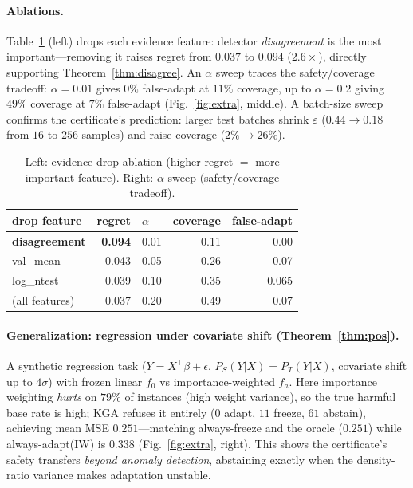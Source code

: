 \documentclass[11pt]{article}
\theoremstyle{plain}
\theoremstyle{definition}
\begin{document}
\paragraph{Ablations.} Table~\ref{tab:abl} (left) drops each evidence feature: detector
\emph{disagreement} is the most important---removing it raises regret from $0.037$ to
$0.094$ ($2.6\times$), directly supporting Theorem~\ref{thm:disagree}. An $\alpha$ sweep
traces the safety/coverage tradeoff: $\alpha{=}0.01$ gives $0\%$ false-adapt at $11\%$
coverage, up to $\alpha{=}0.2$ giving $49\%$ coverage at $7\%$ false-adapt
(Fig.~\ref{fig:extra}, middle). A batch-size sweep confirms the certificate's
prediction: larger test batches shrink $\varepsilon$ ($0.44\!\to\!0.18$ from $16$ to
$256$ samples) and raise coverage ($2\%\!\to\!26\%$).

\begin{table}[h]\centering\small
\begin{tabular}{lr@{\hskip 2em}lrr}
\toprule
drop feature & regret & $\alpha$ & coverage & false-adapt\\
\midrule
\textbf{disagreement} & \textbf{0.094} & 0.01 & 0.11 & 0.00\\
val\_mean & 0.043 & 0.05 & 0.26 & 0.07\\
log\_ntest & 0.039 & 0.10 & 0.35 & 0.065\\
(all features) & 0.037 & 0.20 & 0.49 & 0.07\\
\bottomrule
\end{tabular}
\caption{Left: evidence-drop ablation (higher regret $=$ more important feature).
Right: $\alpha$ sweep (safety/coverage tradeoff).}
\label{tab:abl}
\end{table}

\paragraph{Generalization: regression under covariate shift (Theorem~\ref{thm:pos}).}
A synthetic regression task ($Y=X^\top\beta+\epsilon$, $P_S(Y|X)=P_T(Y|X)$, covariate
shift up to $4\sigma$) with frozen linear $f_0$ vs importance-weighted $f_a$. Here
importance weighting \emph{hurts} on $79\%$ of instances (high weight variance), so the
true harmful base rate is high; \textsc{KGA} refuses it entirely ($0$ adapt, $11$
freeze, $61$ abstain), achieving mean MSE $0.251$---matching always-freeze and the
oracle ($0.251$) while always-adapt(IW) is $0.338$ (Fig.~\ref{fig:extra}, right). This
shows the certificate's safety transfers \emph{beyond anomaly detection}, abstaining
exactly when the density-ratio variance makes adaptation unstable.
\end{document}
